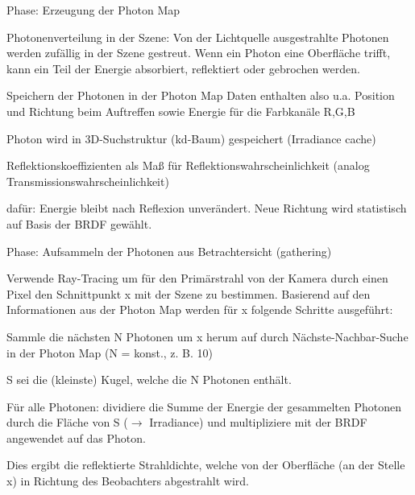 \documentclass[landscape]{article}
\begin{document}
\begin{multicols}{3}
  \begin{enumerate*}
    \item Phase: Erzeugung der Photon Map
    \item Photonenverteilung in der Szene: Von der Lichtquelle ausgestrahlte Photonen werden zufällig in der Szene gestreut. Wenn ein Photon eine Oberfläche trifft, kann ein Teil der Energie absorbiert, reflektiert oder gebrochen werden.
    \item Speichern der Photonen in der Photon Map Daten enthalten also u.a. Position und Richtung beim Auftreffen sowie Energie für die Farbkanäle R,G,B
          \begin{itemize*}
            \item Photon wird in 3D-Suchstruktur (kd-Baum) gespeichert (Irradiance cache)
            \item Reflektionskoeffizienten als Maß für Reflektionswahrscheinlichkeit (analog Transmissionswahrscheinlichkeit)
            \item dafür: Energie bleibt nach Reflexion unverändert. Neue Richtung wird statistisch auf Basis der BRDF gewählt.
          \end{itemize*}
    \item  Phase: Aufsammeln der Photonen aus Betrachtersicht (gathering)
          \begin{itemize*}
            \item Verwende Ray-Tracing um für den Primärstrahl von der Kamera durch einen Pixel den Schnittpunkt x mit der Szene zu bestimmen. Basierend auf den Informationen aus der Photon Map werden für x folgende Schritte ausgeführt:
                  \begin{enumerate*}
                    \item Sammle die nächsten N Photonen um x herum auf durch Nächste-Nachbar-Suche in der Photon Map (N = konst., z. B. 10)
                    \item S sei die (kleinste) Kugel, welche die N Photonen enthält.
                    \item Für alle Photonen: dividiere die Summe der Energie der gesammelten Photonen durch die Fläche von S ($\rightarrow$ Irradiance) und multipliziere mit der  BRDF angewendet auf das Photon.
                    \item Dies ergibt die reflektierte Strahldichte, welche von der Oberfläche (an der Stelle x) in Richtung des Beobachters abgestrahlt wird.
                  \end{enumerate*}
          \end{itemize*}
  \end{enumerate*}
  

\end{multicols}
\end{document}
